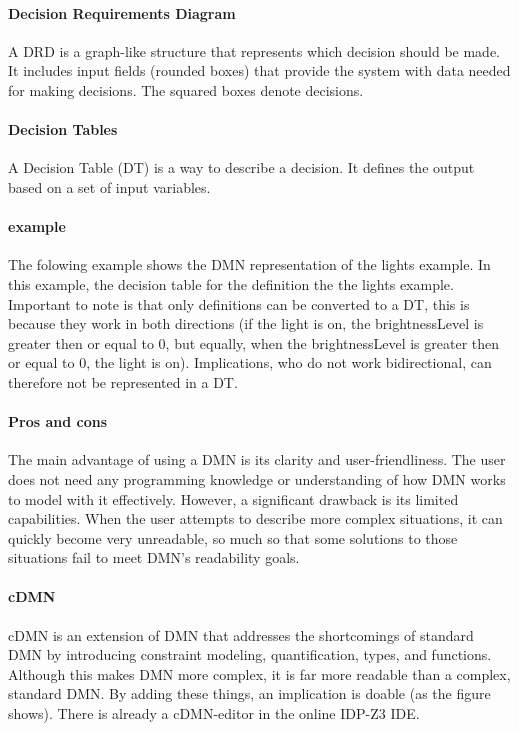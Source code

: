 \documentclass[11pt,a4paper]{report}
\begin{document}
\paragraph{Decision Requirements Diagram}
A DRD is a graph-like structure that represents which decision should be made. It includes input fields (rounded boxes) that provide the system with data needed for making decisions. The squared boxes denote decisions.
\paragraph{Decision Tables}
A Decision Table (DT) is a way to describe a decision. It defines the output based on a set of input variables.
\paragraph{example}
The folowing example shows the DMN representation of the lights example. In this example, the decision table for the definition the the lights example. Important to note is that only definitions can be converted to a DT, this is because they work in both directions (if the light is on, the brightnessLevel is greater then or equal to 0, but equally, when the brightnessLevel is greater then or equal to 0, the light is on). Implications, who do not work bidirectional, can therefore not be represented in a DT.

\paragraph{ Pros and cons}
The main advantage of using a DMN is its clarity and user-friendliness. The user does not need any programming knowledge or understanding of how DMN works to model with it effectively. However, a significant drawback is its limited capabilities. When the user attempts to describe more complex situations, it can quickly become very unreadable, so much so that some solutions to those situations fail to meet DMN's readability goals.
\paragraph{cDMN}
cDMN is an extension of DMN that addresses the shortcomings of standard DMN by introducing constraint modeling, quantification, types, and functions. Although this makes DMN more complex, it is far more readable than a complex, standard DMN. By adding these things, an implication is doable (as the figure shows). There is already a cDMN-editor in the online IDP-Z3 IDE.
\end{document}

